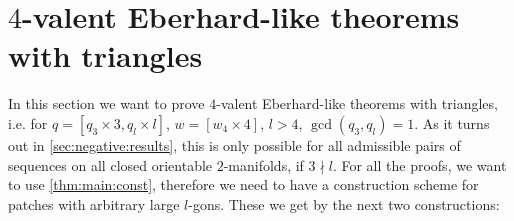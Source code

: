 \section{$4$-valent {\sc Eberhard}-like theorems with triangles}\label{sec:3:4}

In this section we want to prove $4$-valent {\sc Eberhard}-like theorems with triangles, i.e. for $q = [q_3 \times 3, q_l \times l]$, $w = [w_4 \times 4]$, $l > 4$, $\gcd(q_3, q_l) = 1$. As it turns out in \autoref{sec:negative:results}, this is only possible for all admissible pairs of sequences on all closed orientable $2$-manifolds, if $3 \nmid l$. For all the proofs, we want to use \autoref{thm:main:const}, therefore we need to have a construction scheme for patches with arbitrary large $l$-gons. These we get by the next two constructions:

